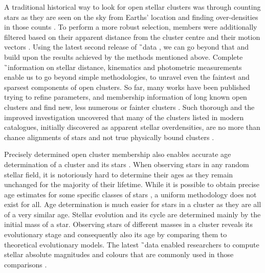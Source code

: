 A traditional historical way to look for open stellar clusters was through counting stars as they are seen on the sky from Earths' location and finding over-densities in those counts \cite{1988AJ.....95..108L, 2014A&A...568A..51S}. To perform a more robust selection, members were additionally filtered based on their apparent distance from the cluster centre and their motion vectors \cite{2017A&A...601A..19G}. Using the latest second release of \G\ data \citep[DR2,][]{2018arXiv180409365G}, we can go beyond that and build upon the results achieved by the methods mentioned above. Complete \G\ information on stellar distance, kinematics and photometric measurements enable us to go beyond simple methodologies, to unravel even the faintest and sparsest components of open clusters. So far, many works have been published trying to refine parameters, and membership information of long known open clusters \cite{2017A&A...601A..19G, 2018A&A...618A..93C, 2019A&A...627A..35C} and find new, less numerous or fainter clusters \cite{2019arXiv190904612B, 2019ApJS..245...32L, 2019JKAS...52..145S, 2019A&A...624A.126C, 2020arXiv200107122C}. Such thorough and the improved investigation uncovered that many of the clusters listed in modern catalogues, initially discovered as apparent stellar overdensities, are no more than chance alignments of stars and not true physically bound clusters \cite{1998A&A...340..402B, 2000A&A...357..145C, 2016AJ....152....7H, 2018MNRAS.480.5242K, 2020A&A...633A..99C}.

Precisely determined open cluster membership also enables accurate age determination of a cluster and its stars \cite{2018ApJ...863...65C}. When observing stars in any random stellar field, it is notoriously hard to determine their ages as they remain unchanged for the majority of their lifetime. While it is possible to obtain precise age estimates for some specific classes of stars \cite{2010ARA&A..48..581S}, a uniform methodology does not exist for all. Age determination is much easier for stars in a cluster as they are all of a very similar age. Stellar evolution and its cycle are determined mainly by the initial mass of a star. Observing stars of different masses in a cluster reveals its evolutionary stage and consequently also its age by comparing them to theoretical evolutionary models. The latest \G\ data enabled researchers to compute stellar absolute magnitudes and colours that are commonly used in those comparisons \cite{2019MNRAS.487.2385M, 2019A&A...623A.108B, 2019A&A...631A.166K}.

